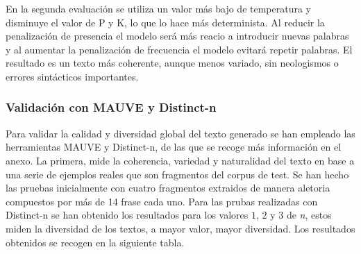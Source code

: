 \documentclass[11pt]{book}
\begin{document}
En la segunda evaluación se utiliza un valor más bajo de temperatura y disminuye el valor de P y K, lo que lo hace más determinista. Al reducir la penalización de presencia el modelo será más reacio a introducir nuevas palabras y al aumentar la penalización de frecuencia el modelo evitará repetir palabras. El resultado es un texto más coherente, aunque menos variado, sin neologismos o errores sintácticos importantes.

\subsubsection{Validación con MAUVE y Distinct-n}
Para validar la calidad y diversidad global del texto generado se han empleado las herramientas MAUVE y Distinct-n, de las que se recoge más información en el anexo. La primera, mide la coherencia, variedad y naturalidad del texto en base a una serie de ejemplos reales que son fragmentos del corpus de test. Se han hecho las pruebas inicialmente con cuatro fragmentos extraidos de manera aletoria compuestos por más de 14 frase cada uno. Para las prubas realizadas con Distinct-n se han obtenido los resultados para los valores $1$, $2$ y $3$ de \textit{n}, estos miden la diversidad de los textos, a mayor valor, mayor diversidad. Los resultados obtenidos se recogen en la siguiente tabla.
\end{document}
